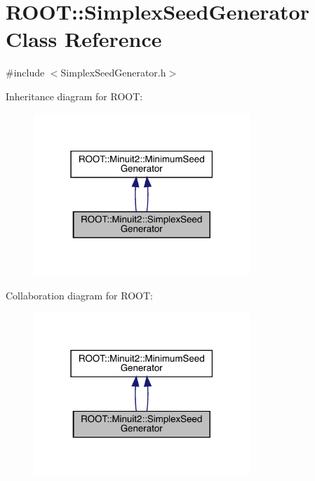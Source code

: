 \hypertarget{classROOT_1_1Minuit2_1_1SimplexSeedGenerator}{}\section{R\+O\+OT\+:\+:Simplex\+Seed\+Generator Class Reference}
\label{classROOT_1_1Minuit2_1_1SimplexSeedGenerator}


{\ttfamily \#include $<$Simplex\+Seed\+Generator.\+h$>$}



Inheritance diagram for R\+O\+OT\+:\nopagebreak
\begin{figure}[H]
\begin{center}
\leavevmode
\includegraphics[width=231pt]{d2/da8/classROOT_1_1Minuit2_1_1SimplexSeedGenerator__inherit__graph}
\end{center}
\end{figure}


Collaboration diagram for R\+O\+OT\+:\nopagebreak
\begin{figure}[H]
\begin{center}
\leavevmode
\includegraphics[width=231pt]{da/d52/classROOT_1_1Minuit2_1_1SimplexSeedGenerator__coll__graph}
\end{center}
\end{figure}
